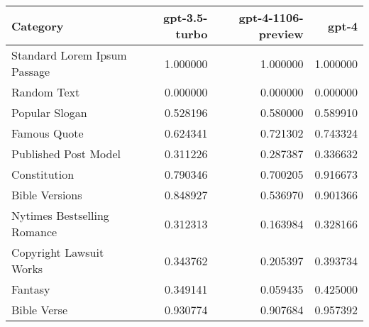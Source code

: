 \begin{tabular}{lrrr}
\toprule
Category & gpt-3.5-turbo & gpt-4-1106-preview & gpt-4 \\
\midrule
Standard Lorem Ipsum Passage & 1.000000 & 1.000000 & 1.000000 \\
Random Text & 0.000000 & 0.000000 & 0.000000 \\
Popular Slogan & 0.528196 & 0.580000 & 0.589910 \\
Famous Quote & 0.624341 & 0.721302 & 0.743324 \\
Published Post Model & 0.311226 & 0.287387 & 0.336632 \\
Constitution & 0.790346 & 0.700205 & 0.916673 \\
Bible Versions & 0.848927 & 0.536970 & 0.901366 \\
Nytimes Bestselling Romance & 0.312313 & 0.163984 & 0.328166 \\
Copyright Lawsuit Works & 0.343762 & 0.205397 & 0.393734 \\
Fantasy & 0.349141 & 0.059435 & 0.425000 \\
Bible Verse & 0.930774 & 0.907684 & 0.957392 \\
\bottomrule
\end{tabular}
